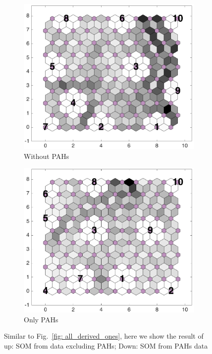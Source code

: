 \begin{figure}
    \begin{subfigure}[b]{0.5\textwidth}
        \centering
        \includegraphics[width=\textwidth]{../../images0.01/M31/2D/diff_dimension/combine_2D_data_between_cols11and26.png}
    \caption{Without PAHs}
    \label{fig: wt_pahs}
    \end{subfigure}
    \hfill
    \begin{subfigure}[b]{0.5\textwidth}
        \includegraphics[width=\textwidth]{../../images0.01/M31/2D/diff_dimension/combine_2D_data_between_cols3and10.png}
    \caption{Only PAHs}
    \label{fig: only_pahs}
    \end{subfigure}
    \caption{Similar to Fig.~\ref{fig: all_derived_ones}, here we show the result of up: SOM from data excluding PAHs; Down: SOM from PAHs data}
    \label{fig: PAHS_or_not_PAHs}
\end{figure}